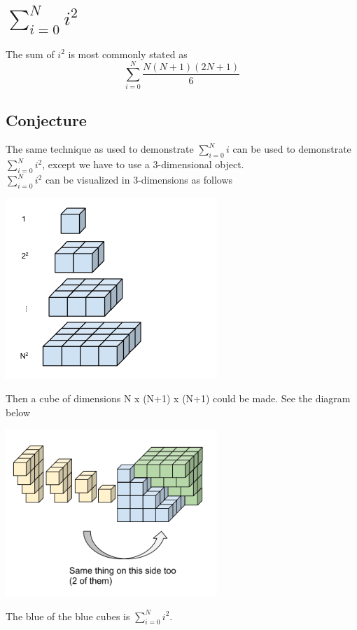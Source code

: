 \section{$\sum\limits_{i=0}^N{i^2}$}
The sum of \(i^2\) is most commonly stated as
\[\sum\limits_{i=0}^N{\frac{N(N+1)(2N+1)}{6}}\]

\subsection{Conjecture}
The same technique as used to demonstrate \(\sum\limits_{i=0}^N{i}\) can be used to demonstrate \(\sum\limits_{i=0}^N{i^2}\), except we have to use a 3-dimensional object.\\
\(\sum\limits_{i=0}^N{i^2}\) can be visualized in 3-dimensions as follows
\begin{center}
\includegraphics[width=8cm]{Summations/sum_i2_diag1}
\end{center}
Then a cube of dimensions N x (N+1) x (N+1) could be made.  See the diagram below\\
\begin{center}
\includegraphics[width=8cm]{Summations/sum_i2_diag2}
\end{center}
The blue of the blue cubes is \(\sum\limits_{i=0}^N{i^2}\).  \\
